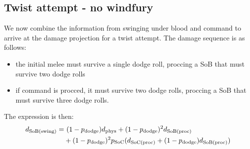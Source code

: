 \subsection{Twist attempt - no windfury}
We now combine the information from swinging under blood and command to arrive at the damage projection for a twist attempt.
The damage sequence is as follows:
\begin{itemize}
	\item the initial melee must survive a single dodge roll, proccing a SoB that must survive two dodge rolls
	\item if command is procced, it must survive two dodge rolls, proccing a SoB that must survive three dodge rolls.
\end{itemize}
The expression is then:
\begin{equation*}
	\begin{aligned}
		d_\mathrm{SoB(swing)}  =&~ (1 - p_{\mathrm{dodge}} ) d_{\mathrm{phys}}  + (1-p_{\mathrm{dodge}} )^2 d_\mathrm{SoB(proc)}  \\
		&+ (1-p_{\mathrm{dodge}} )^2 p_\mathrm{SoC}   (d_\mathrm{SoC(proc)}  + (1-p_{\mathrm{dodge}} ) d_\mathrm{SoB(proc)} )
	\end{aligned}
\end{equation*}

